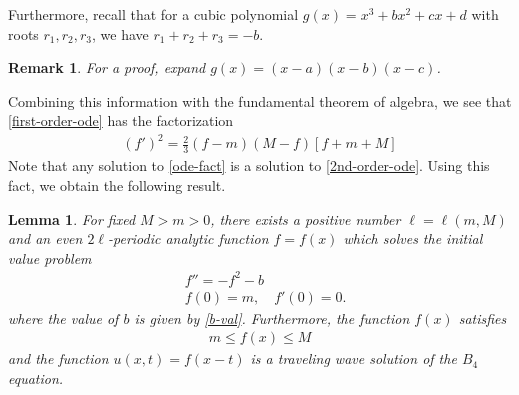 \documentclass[12pt,reqno]{amsart}
\numberwithin{equation}{section}  %
\newtheorem{lemma}[theorem]{Lemma}
\newtheorem{remark}[theorem]{Remark}
\begin{document}
%
%
%
Furthermore, recall that for a cubic polynomial $g(x) = x^{3} +bx^{2} +cx +d$
with roots $r_{1}, r_{2}, r_{3}$, we have $r_{1} + r_{2} + r_{3} = -b$.
%
%
\begin{framed}
%
%
\begin{remark}
\label{rem:fact-pf}
For a proof, expand 
$g(x) = (x-a)(x-b)(x-c)$.
\end{remark}
%
%
\end{framed}
%
%
Combining this information with the fundamental theorem of algebra, 
we see that \eqref{first-order-ode} has the factorization
%
%
%
%
\begin{equation}
\begin{split}
  \left ( f'\right )^{2}
  = \frac{2}{3} \left (f-m\right )
  \left( M-f\right )
  \left [ f + m +M  \right ]
\end{split}
\label{ode-fact}
\end{equation}
%
Note that any solution to \eqref{ode-fact} is a solution to
\eqref{2nd-order-ode}. Using this fact, we obtain the following result.
%
%
%
%
%
%                
%
%
%
%
\begin{lemma}
  For fixed $M > m > 0$,  there exists a positive
  number $\ell = \ell(m, M)$ and an even $2\ell$-periodic analytic function $f =
  f(x)$ which solves the initial value problem
\begin{align}
  \label{2nd-order-ode}
& f'' = - f^{2} - b
\\
\label{2nd-order-ode-data}
& f(0)=m, \quad f'(0) = 0.
\end{align}
where the value of $b$ is given by \eqref{b-val}. Furthermore, the function
  $f(x)$ satisfies
  \begin{equation}
    \label{f-bound}
  \begin{split}
  m \le f(x) \le M
  \end{split}
  \end{equation}
  and the function $u(x,t) = f(x-t)$ is a traveling wave solution of the
  $B_{4}$ equation. 
\label{lem:ode-solution}
\end{lemma}
%
%
%
\end{document}
